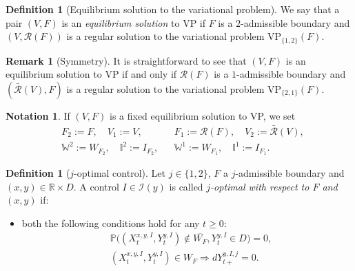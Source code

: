 \documentclass[10pt]{article}
\numberwithin{equation}{section}
\theoremstyle{plain}
\numberwithin{theorem}{section}
\theoremstyle{definition}
\newtheorem{definition}[theorem]{Definition}
\newtheorem{notation}[theorem]{Notation}
\newtheorem{remark}[theorem]{Remark}
\def \R {\mathbb{R}}
\newcommand{\<}{\langle}
\renewcommand{\>}{\rangle}
\renewcommand{\(}{\left(}
\renewcommand{\)}{\right)}
\newcommand\Pb{\mathbb{P}}
\newcommand\Wb{\mathbb{W}}
\newcommand\Ib{\mathbb{I}}
\def \R  {{\mathbb {R}}}
\def \R {{\mathbb {R}}}
\def\cI{{\mathcal I}}
\def\cR{{\mathcal R}}
\begin{document}
{{{\begin{definition}[Equilibrium solution to the variational problem]\label{def:equilibrium_sol}
We say that a pair $(V,F)$ is an {\em equilibrium solution} to VP if $F$ is a $2$-admissible boundary and $(V,\cR (F))$ is a regular solution to the variational problem $\text{VP}_{\{1,2\}}(F)$.
\end{definition}
\begin{remark}[Symmetry]\label{rem:equilibrium_sol}
It is straightforward to see that $(V,F)$ is an equilibrium solution to VP if and only if $\cR (F)$ is a $1$-admissible boundary and $(\bar\cR (V),F)$ is a regular solution to the variational problem $\text{VP}_{\{2,1\}}(F)$.
\end{remark}

\begin{notation}\label{notation_V_F}
If $(V,F)$ is a fixed equilibrium solution to VP, we set
\begin{align}%
&F_2:= F, \quad V_1:= V,&& F_1:= \cR (F), \quad V_2:= \bar\cR(V),\\
&\Wb^2:= W_{F_2} , \quad \Ib^2:= I_{F_2}, && \Wb^1:= W_{F_1}, \quad \Ib^1:= I_{F_1}.
\end{align}
\end{notation}
\begin{definition}[$j$-optimal control]\label{def:i_optimal_control}
Let $j\in\{ 1,2 \}$, $F$ a $j$-admissible boundary and $(x,y)\in \R\times {D}$. A control $I\in \cI(y)$ is called \emph{$j$-optimal with respect to $F$ and $(x,y)$} if:
\begin{itemize}
\item[(i)] both the following conditions hold for {any $t\geq 0$}: 
\begin{align}%
&{\Pb\Big( (X^{x,y,I}_t,Y^{y,I}_t) \notin \overline{W_F} , Y^{y,I}_t \in D  \Big) = 0 },%
\label{eq:cond_a_i_optimal}\\
&(X^{x,y,I}_t, Y^{y,I}_t) \in W_F \Rightarrow {d Y^{y,I,j}_{t+}} = 0.%
\label{eq:cond_b_i_optimal} %

\end{align}
\end{itemize}
\end{definition}}}}
\end{document}
